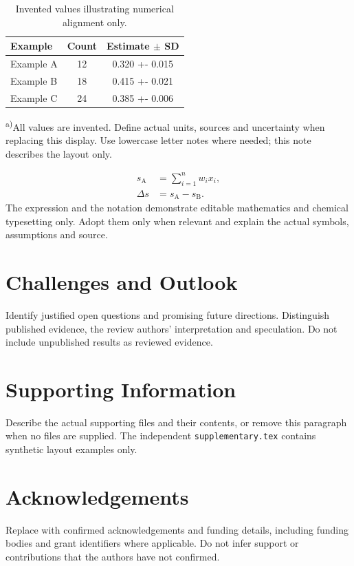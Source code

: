 \documentclass[a4paper,11pt]{article}
\begin{document}
\begin{table}[htbp]
\centering\small
\caption{Invented values illustrating numerical alignment only.}
\label{tab:comparison}
\begin{tabularx}{\linewidth}{@{}>{\raggedright\arraybackslash}X
 S[table-format=2.0] S[table-format=1.3(3)]@{}}
\toprule
Example & {Count} & {Estimate $\pm$ SD}\\
\midrule
Example A & 12 & 0.320 +- 0.015\\
Example B & 18 & 0.415 +- 0.021\\
Example C & 24 & 0.385 +- 0.006\\
\bottomrule
\end{tabularx}
\par\smallskip\footnotesize\raggedright
\textsuperscript{a)}All values are invented. Define actual units, sources
and uncertainty when replacing this display. Use lowercase letter notes
where needed; this note describes the layout only.
\end{table}

\begin{equation}
\begin{split}
 s_{\mathrm{A}} &= \sum_{i=1}^{n} w_i x_i,\\
 \Delta s &= s_{\mathrm{A}}-s_{\mathrm{B}}.
\end{split}\label{eq:illustration}
\end{equation}
The expression and the notation  demonstrate editable mathematics
and chemical typesetting only. Adopt them only when relevant and explain
the actual symbols, assumptions and source.

\section{Challenges and Outlook}\label{sec:outlook}
Identify justified open questions and promising future directions.
Distinguish published evidence, the review authors' interpretation and
speculation. Do not include unpublished results as reviewed evidence.

\section*{Supporting Information}
Describe the actual supporting files and their contents, or remove this
paragraph when no files are supplied. The independent
\texttt{supplementary.tex} contains synthetic layout examples only.

\section*{Acknowledgements}
Replace with confirmed acknowledgements and funding details, including
funding bodies and grant identifiers where applicable. Do not infer support
or contributions that the authors have not confirmed.
\end{document}
